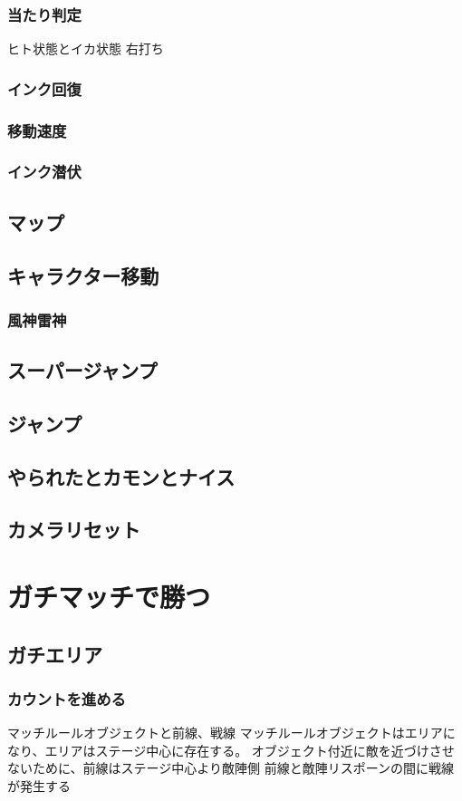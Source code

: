 \documentclass[a4paper,11pt]{jsbook}
\begin{document}
\subsection{当たり判定}
ヒト状態とイカ状態
右打ち
\subsection{インク回復}
\subsection{移動速度}
\subsection{インク潜伏}
\section{マップ}
\section{キャラクター移動}
\subsection{風神雷神}
\section{スーパージャンプ}
\section{ジャンプ}
\section{やられたとカモンとナイス}
\section{カメラリセット}

\chapter{ガチマッチで勝つ}
\section{ガチエリア}
\subsection{カウントを進める}
マッチルールオブジェクトと前線、戦線
マッチルールオブジェクトはエリアになり、エリアはステージ中心に存在する。
オブジェクト付近に敵を近づけさせないために、前線はステージ中心より敵陣側
前線と敵陣リスポーンの間に戦線が発生する
\end{document}

